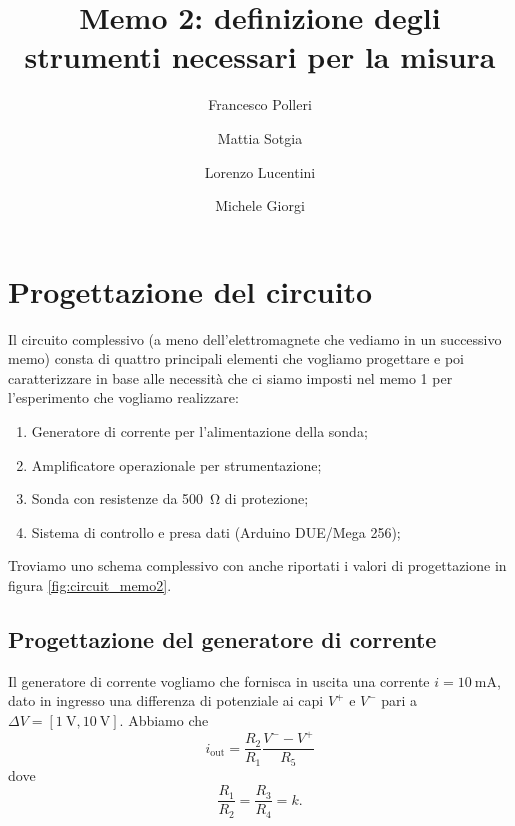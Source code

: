 \documentclass[fleqn,varvw,preprintnumbers,citeautoscript]{memo}
\begin{document}
\title{Memo 2: definizione degli strumenti necessari per la misura}

\author{Francesco Polleri}
\author{Mattia Sotgia}


\author{Lorenzo Lucentini}
\author{Michele Giorgi}

\revised{\today}

\begin{abstract}

\end{abstract}
\maketitle

\section{Progettazione del circuito}

Il circuito complessivo (a meno dell'elettromagnete che vediamo in un successivo memo) consta di quattro principali elementi che vogliamo progettare e poi caratterizzare in base alle necessità che ci siamo imposti nel memo 1 per l'esperimento che vogliamo realizzare: \begin{enumerate}[1.]
    \item Generatore di corrente per l'alimentazione della sonda;
    \item Amplificatore operazionale per strumentazione;
    \item Sonda con resistenze da \SI{500}{\ohm} di protezione;
    \item Sistema di controllo e presa dati (Arduino DUE/Mega 256);
\end{enumerate}

Troviamo uno schema complessivo con anche riportati i valori di progettazione in figura \ref{fig:circuit_memo2}.

\subsection{Progettazione del generatore di corrente}

Il generatore di corrente vogliamo che fornisca in uscita una corrente $i=\SI{10}{\milli\ampere}$, dato in ingresso una differenza di potenziale ai capi $V^+$ e $V^-$ pari a $\Delta V = [\SI{1}{\volt}, \SI{10}{\volt}]$. Abbiamo che \begin{equation}
    i_\text{out} = \frac{R_2}{R_1}\frac{V^--V^+}{R_5}\label{eq:gen}
\end{equation} dove \[\frac{R_1}{R_2} = \frac{R_3}{R_4}=k.\]
\end{document}
